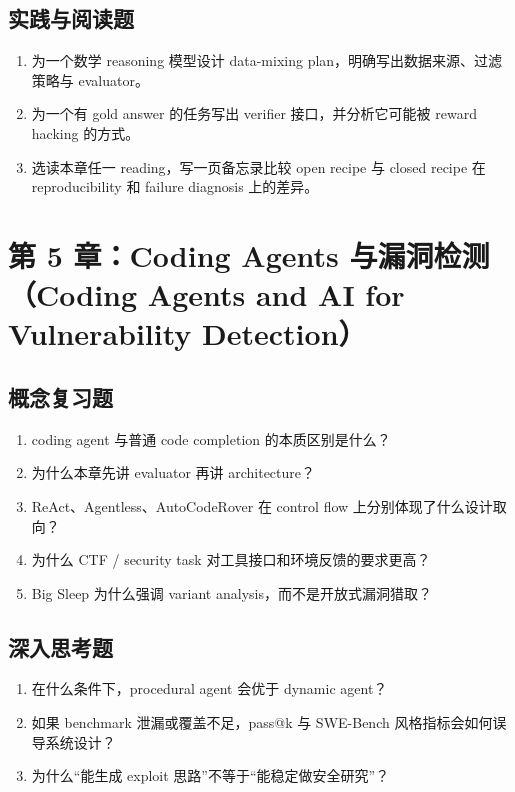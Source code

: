 \subsection*{实践与阅读题}
\begin{enumerate}
\item 为一个数学 reasoning 模型设计 data-mixing plan，明确写出数据来源、过滤策略与 evaluator。
\item 为一个有 gold answer 的任务写出 verifier 接口，并分析它可能被 reward hacking 的方式。
\item 选读本章任一 reading，写一页备忘录比较 open recipe 与 closed recipe 在 reproducibility 和 failure diagnosis 上的差异。
\end{enumerate}

\section{第 5 章：Coding Agents 与漏洞检测（Coding Agents and AI for Vulnerability Detection）}

\subsection*{概念复习题}
\begin{enumerate}
\item coding agent 与普通 code completion 的本质区别是什么？
\item 为什么本章先讲 evaluator 再讲 architecture？
\item ReAct、Agentless、AutoCodeRover 在 control flow 上分别体现了什么设计取向？
\item 为什么 CTF / security task 对工具接口和环境反馈的要求更高？
\item Big Sleep 为什么强调 variant analysis，而不是开放式漏洞猎取？
\end{enumerate}

\subsection*{深入思考题}
\begin{enumerate}
\item 在什么条件下，procedural agent 会优于 dynamic agent？
\item 如果 benchmark 泄漏或覆盖不足，pass@k 与 SWE-Bench 风格指标会如何误导系统设计？
\item 为什么“能生成 exploit 思路”不等于“能稳定做安全研究”？
\end{enumerate}

